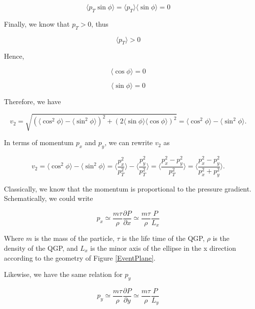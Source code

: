 \begin{equation}
\langle p_T \sin \phi \rangle =  \langle p_T \rangle \langle  \sin \phi \rangle = 0
\end{equation}

Finally, we know that $p_T > 0$, thus   
 
\begin{equation}
\langle p_T \rangle > 0
\end{equation}  
 
Hence,  


\begin{equation}
\langle \cos \phi \rangle =  0
\end{equation} 


\begin{equation}
\langle \sin \phi \rangle =  0
\end{equation}

Therefore, we have 

\begin{equation}
v_2 = \sqrt{(\langle \cos^2 \phi \rangle - \langle \sin^2 \phi \rangle)^2 + (2  \langle \sin \phi \rangle \langle \cos \phi \rangle)^2} = \langle \cos^2 \phi \rangle - \langle \sin^2 \phi \rangle. 
\end{equation}

In terms of momentum $p_x$ and $p_y$, we can rewrite $v_2$ as 

\begin{equation}
v_2 =  \langle \cos^2 \phi \rangle - \langle \sin^2 \phi \rangle = \langle\frac{p_x^2}{p_T^2} \rangle - \langle \frac{p_y^2}{p_T^2} \rangle = \langle \frac{p_x^2 - p_y^2}{p_T^2} \rangle = \langle \frac{p_x^2 - p_y^2}{p_x^2 + p_y^2} \rangle. 
\end{equation}

Classically, we know that the momentum is proportional to the pressure gradient. Schematically, we could write

\begin{equation}
p_x \simeq \frac{m\tau}{\rho}\frac{\partial P}{\partial x} \simeq \frac{m\tau}{\rho}\frac{P}{L_x}
\end{equation}

Where $m$ is the mass of the particle, $\tau$ is the life time of the QGP, $\rho$ is the density of the QGP, and $L_x$ is the minor axis of the ellipse in the x direction according to the geometry of Figure \ref{EventPlane}.

Likewise, we have the same relation for $p_y$

\begin{equation}
p_y \simeq \frac{m\tau}{\rho}\frac{\partial P}{\partial y} \simeq \frac{m\tau}{\rho}\frac{ P}{L_y}
\end{equation} 

